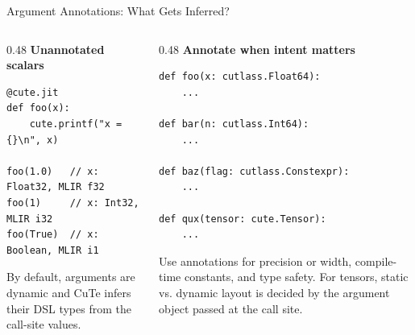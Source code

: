 \documentclass[aspectratio=169,11pt]{beamer}
\begin{document}
\begin{frame}[fragile]{Argument Annotations: What Gets Inferred?}
\begin{columns}[T,totalwidth=\textwidth]
  \begin{column}{0.48\textwidth}
    \small\textbf{Unannotated scalars}
\begin{lstlisting}[style=traceir]
@cute.jit
def foo(x):
    cute.printf("x = {}\n", x)

foo(1.0)   // x: Float32, MLIR f32
foo(1)     // x: Int32,   MLIR i32
foo(True)  // x: Boolean, MLIR i1
\end{lstlisting}

    \vspace{0.25em}
    \footnotesize\color{TraceNote}
    By default, arguments are dynamic and CuTe infers their DSL types from the
    call-site values.
  \end{column}

  \begin{column}{0.48\textwidth}
    \small\textbf{Annotate when intent matters}
\begin{lstlisting}[style=traceir]
def foo(x: cutlass.Float64):
    ...

def bar(n: cutlass.Int64):
    ...

def baz(flag: cutlass.Constexpr):
    ...

def qux(tensor: cute.Tensor):
    ...
\end{lstlisting}

    \vspace{0.25em}
    \footnotesize\color{TraceNote}
    Use annotations for precision or width, compile-time constants, and type
    safety. For tensors, static vs. dynamic layout is decided by the argument
    object passed at the call site.
  \end{column}
\end{columns}
\end{frame}
\end{document}

